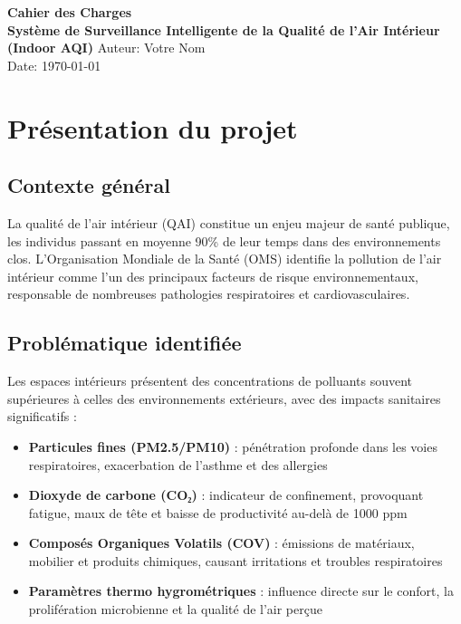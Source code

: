 \documentclass[12pt,a4paper]{article}
\begin{document}
\begin{titlepage}
    \centering
    \vspace*{3cm}
    {\Huge\bfseries Cahier des Charges\\[0.5cm]
    Système de Surveillance Intelligente de la Qualité de l'Air Intérieur (Indoor AQI)}
    \vfill
    {\large Auteur: Votre Nom \\
    Date: \today}
\end{titlepage}

\tableofcontents
\newpage

\section{Présentation du projet}
\subsection{Contexte général}
La qualité de l'air intérieur (QAI) constitue un enjeu majeur de santé publique, les individus passant en moyenne 90\% de leur temps dans des environnements clos. L'Organisation Mondiale de la Santé (OMS) identifie la pollution de l'air intérieur comme l'un des principaux facteurs de risque environnementaux, responsable de nombreuses pathologies respiratoires et cardiovasculaires.

\subsection{Problématique identifiée}
Les espaces intérieurs présentent des concentrations de polluants souvent supérieures à celles des environnements extérieurs, avec des impacts sanitaires significatifs :
\begin{itemize}
    \item \textbf{Particules fines (PM2.5/PM10)} : pénétration profonde dans les voies respiratoires, exacerbation de l'asthme et des allergies
    \item \textbf{Dioxyde de carbone (CO₂)} : indicateur de confinement, provoquant fatigue, maux de tête et baisse de productivité au-delà de 1000 ppm
    \item \textbf{Composés Organiques Volatils (COV)} : émissions de matériaux, mobilier et produits chimiques, causant irritations et troubles respiratoires
    \item \textbf{Paramètres thermo hygrométriques} : influence directe sur le confort, la prolifération microbienne et la qualité de l'air perçue
\end{itemize}
\end{document}
